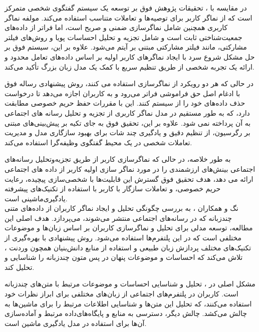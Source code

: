 در مقایسه با %
\cite{azzam2022model}
، تحقیقات پژوهش فوق بر توسعه یک سیستم گفتگوی شخصی متمرکز است که از نماگر کاربر برای توصیه‌ها و تعاملات متناسب استفاده می‌کند. مولفه نماگر کاربری همچنین شامل نماگر‌سازی ضمنی و صریح است، اما فراتر از داده‌های جمعیت‌شناختی ثابت است و شامل تجزیه و تحلیل احساسات پویا و روش‌های فیلتر مشارکتی، مانند فیلتر مشارکتی مبتنی بر آیتم می‌شود. علاوه بر این، سیستم فوق بر حل مشکل شروع سرد با ایجاد نماگر‌های کاربر اولیه بر اساس داده‌های تعامل محدود و ارائه یک تجربه شخصی از طریق تنظیم سریع با کمک یک مدل زبان بزرگ تأکید می‌کند.

در حالی که هر دو رویکرد از نماگر‌سازی استفاده می کنند، روش پیشنهادی رساله فوق با ادغام اصل حق فراموشی فراتر می‌رود و به کاربران اجازه می‌دهد تا درخواست حذف داده‌های خود را از سیستم کنند. این با مقررات حفظ حریم خصوصی مطابقت دارد، که به طور مستقیم در مدل نماگر کاربری از تجزیه و تحلیل رسانه های اجتماعی به آن پرداخته نمی شود. علاوه بر این، تحقیق فوق به جای تکیه بر پیش‌بینی‌های مبتنی بر رگرسیون، از تنظیم دقیق و یادگیری چند شات برای بهبود سازگاری مدل و مدیریت تعاملات شخصی در یک محیط گفتگوی وظیفه‌گرا استفاده می‌کند.

به طور خلاصه، در حالی که نماگر‌سازی کاربر از طریق تجزیه‌وتحلیل رسانه‌های اجتماعی بینش‌های ارزشمندی را در مورد نماگر سازی اولیه کاربر از داده های اجتماعی ارائه می دهد، هدف تحقیق فوق گسترش این قابلیت‌ها با شخصی‌سازی پیچیده، رعایت حریم خصوصی، و تعاملات سازگار با کاربر با استفاده از تکنیک‌های پیشرفته یادگیری‌ماشینی است.\\


نگ و همکاران %
\cite{nag2023knowledge}، 
 به بررسی چگونگی تحلیل و ایجاد نماگر کاربران از داده‌های متنی چندزبانه که در رسانه‌های اجتماعی منتشر می‌شوند، می‌پردازد. هدف اصلی این مطالعه، توسعه مدلی برای تحلیل و نماگر‌سازی کاربران بر اساس زبان‌ها و موضوعات مختلفی است که در این پلتفرم‌ها استفاده می‌شود. روش پیشنهادی با بهره‌گیری از تکنیک‌های مختلف پردازش زبان طبیعی و استفاده از منابع دانش‌بنیان همچون 
وردنت%
، تلاش می‌کند که احساسات و موضوعات پنهان در پس متون چندزبانه را شناسایی و تحلیل کند.

مشکل اصلی در
\cite{nag2023knowledge}
، تحلیل و شناسایی احساسات و موضوعات مرتبط با متن‌های چندزبانه است. کاربران در پلتفرم‌های اجتماعی از زبان‌های مختلفی برای ابراز نظرات خود استفاده می‌کنند، که تحلیل این متن‌ها و شناسایی اطلاعات مرتبط را برای ماشین‌ها به چالش می‌کشد. چالش دیگر، دسترسی به منابع و پایگاه‌های‌داده مرتبط و آماده‌سازی آن‌ها برای استفاده در مدل یادگیری ماشین است.



